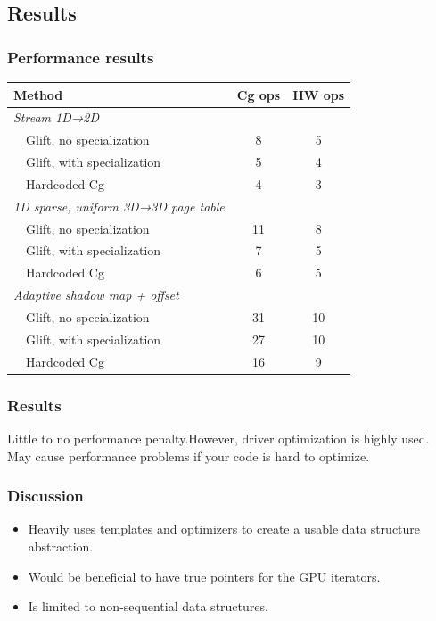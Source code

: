 \documentclass[xcolor={usenames,dvipsnames}]{beamer}
\begin{document}
\subsection{Results}
\begin{frame}
  \frametitle{Performance results}
  \begin{tabular}{l c c}
    Method & Cg ops & HW ops \\\hline
    \emph{Stream 1D→2D} &&\\
    ~~Glift, no specialization & 8 & 5 \\
    ~~Glift, with specialization & 5 & 4 \\
    ~~Hardcoded Cg & 4 & 3\\
    \emph{1D sparse, uniform 3D→3D page table} &&\\
    ~~Glift, no specialization & 11 & 8 \\
    ~~Glift, with specialization & 7 & 5 \\
    ~~Hardcoded Cg & 6 & 5\\
    \emph{Adaptive shadow map + offset} &&\\
    ~~Glift, no specialization & 31 & 10 \\
    ~~Glift, with specialization & 27 & 10 \\
    ~~Hardcoded Cg & 16 & 9\\
  \end{tabular}
\end{frame}

\begin{frame}
  \frametitle{Results}

  Little to no performance penalty.\pause However, driver optimization is highly
  used. May cause performance problems if your code is hard to optimize.
\end{frame}

\begin{frame}
  \frametitle{Discussion}

  \begin{itemize}
  \item<1-> Heavily uses templates and optimizers to create a usable data
    structure abstraction.
  \item<2-> Would be beneficial to have true pointers for the GPU iterators.
  \item<3-> Is limited to non-sequential data structures.
  \end{itemize}
\end{frame}
\end{document}
